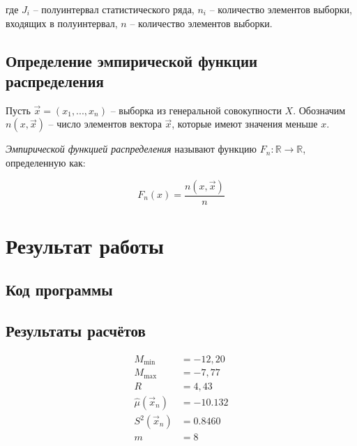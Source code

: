 где $J_i$ -- полуинтервал статистического ряда, $n_i$ -- количество элементов выборки, входящих в полуинтервал, $n$ -- количество элементов выборки.


\section{Определение эмпирической функции распределения}

Пусть $\vec x = (x_1, ..., x_n)$ -- выборка из генеральной совокупности $X$. Обозначим $n(x, \vec x)$ -- число элементов вектора $\vec x$, которые имеют значения меньше $x$.

\textit{Эмпирической функцией распределения} называют функцию $F_n: \mathbb{R} \to \mathbb{R}$, определенную как: 

\begin{equation}
    F_n(x) = \frac{n(x, \vec x)}{n}
\end{equation}

\chapter{Результат работы}

\section{Код программы}



\section{Результаты расчётов}

\begin{align*}
    M_{\min} &= -12,20 \\
    M_{\max} &= -7,77 \\
    R &= 4,43 \\
    \hat\mu(\vec x_n) &= -10.132 \\
    S^2(\vec x_n) &= 0.8460 \\
    m & = 8\\
\end{align*}


